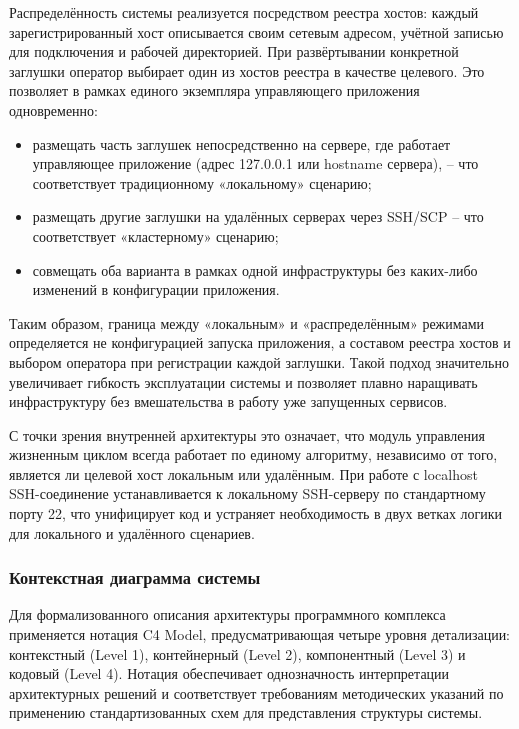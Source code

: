 \documentclass[
]{article}
\begin{document}
Распределённость системы реализуется посредством реестра хостов: каждый
зарегистрированный хост описывается своим сетевым адресом, учётной
записью для подключения и рабочей директорией. При развёртывании
конкретной заглушки оператор выбирает один из хостов реестра в качестве
целевого. Это позволяет в рамках единого экземпляра управляющего
приложения одновременно:

\begin{itemize}
\item
  размещать часть заглушек непосредственно на сервере, где работает
  управляющее приложение (адрес 127.0.0.1 или hostname сервера), -- что
  соответствует традиционному «локальному» сценарию;
\item
  размещать другие заглушки на удалённых серверах через SSH/SCP -- что
  соответствует «кластерному» сценарию;
\item
  совмещать оба варианта в рамках одной инфраструктуры без каких-либо
  изменений в конфигурации приложения.
\end{itemize}

Таким образом, граница между «локальным» и «распределённым» режимами
определяется не конфигурацией запуска приложения, а составом реестра
хостов и выбором оператора при регистрации каждой заглушки. Такой подход
значительно увеличивает гибкость эксплуатации системы и позволяет плавно
наращивать инфраструктуру без вмешательства в работу уже запущенных
сервисов.

С точки зрения внутренней архитектуры это означает, что модуль
управления жизненным циклом всегда работает по единому алгоритму,
независимо от того, является ли целевой хост локальным или удалённым.
При работе с localhost SSH-соединение устанавливается к локальному
SSH-серверу по стандартному порту 22, что унифицирует код и устраняет
необходимость в двух ветках логики для локального и удалённого
сценариев.

\subsubsection{Контекстная диаграмма
системы}\label{ux43aux43eux43dux442ux435ux43aux441ux442ux43dux430ux44f-ux434ux438ux430ux433ux440ux430ux43cux43cux430-ux441ux438ux441ux442ux435ux43cux44b}

Для формализованного описания архитектуры программного комплекса
применяется нотация C4 Model, предусматривающая четыре уровня
детализации: контекстный (Level 1), контейнерный (Level 2), компонентный
(Level 3) и кодовый (Level 4). Нотация обеспечивает однозначность
интерпретации архитектурных решений и соответствует требованиям
методических указаний по применению стандартизованных схем для
представления структуры системы.
\end{document}
